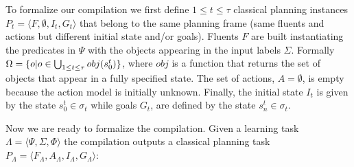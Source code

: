 \documentclass{article}
\newcommand{\tup}[1]{{\langle #1 \rangle}}
\begin{document}
To formalize our compilation we first define {\small $1\leq t\leq \tau$} classical planning instances $P_t=\tup{F,\emptyset,I_t,G_t}$ that belong to the same planning frame (same fluents and actions but different initial state and/or goals). Fluents $F$ are built instantiating the predicates in $\Psi$ with the objects appearing in the input labels $\Sigma$. Formally $\Omega=\{o|o\in \bigcup_{\small 1\leq t\leq \tau} obj(s_0^t)\}$, where $obj$ is a function that returns the set of objects that appear in a fully specified state. The set of actions, $A=\emptyset$, is empty because the action model is initially unknown. Finally, the initial state $I_t$ is given by the state $s_0^t\in \sigma_t$ while goals $G_t$, are defined by the state $s_n^t\in \sigma_t$.

Now we are ready to formalize the compilation. Given a learning task $\Lambda=\tup{\Psi,\Sigma,\Phi}$ the compilation outputs a classical planning task $P_{\Lambda}=\tup{F_{\Lambda},A_{\Lambda},I_{\Lambda},G_{\Lambda}}$:
\end{document}

